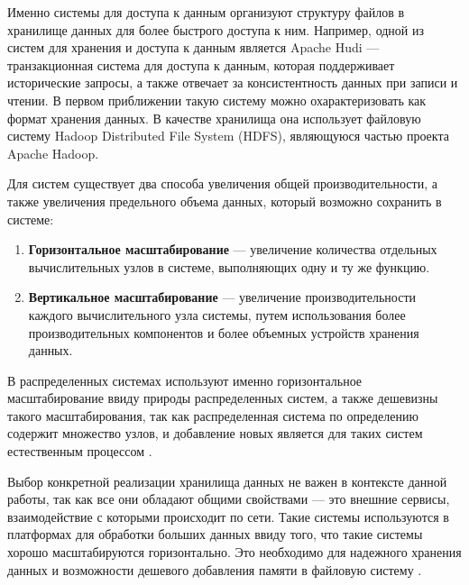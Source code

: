 Именно системы для доступа к данным организуют структуру файлов в хранилище данных для более быстрого доступа к ним. Например, одной из систем для хранения и доступа к данным является Apache Hudi --- транзакционная система для доступа к данным, которая поддерживает исторические запросы, а также отвечает за консистентность данных при записи и чтении. В первом приближении такую систему можно охарактеризовать как формат хранения данных. В качестве хранилища она использует файловую систему Hadoop Distributed File System (HDFS), являющуюся частью проекта Apache Hadoop. 

Для систем существует два способа увеличения общей производительности, а также увеличения предельного объема данных, который возможно сохранить в системе: \cite{Advanced_computer_architecture_and_parallel_processing}
\begin{enumerate}
    \item \textbf{Горизонтальное масштабирование} ---  увеличение количества отдельных вычислительных узлов в системе, выполняющих одну и ту же функцию.
    \item \textbf{Вертикальное масштабирование} --- увеличение производительности каждого вычислительного узла системы, путем использования более производительных компонентов и более объемных устройств хранения данных.
\end{enumerate}

В распределенных системах используют именно горизонтальное масштабирование ввиду природы распределенных систем, а также дешевизны такого масштабирования, так как распределенная система по определению содержит множество узлов, и добавление новых является для таких систем естественным процессом \cite{Advanced_computer_architecture_and_parallel_processing}.

Выбор конкретной реализации хранилища данных не важен в контексте данной работы, так как все они обладают общими свойствами --- это внешние  сервисы, взаимодействие с которыми происходит по сети. Такие системы используются в платформах для обработки больших данных ввиду того, что такие системы хорошо масштабируются горизонтально. Это необходимо для надежного хранения данных и возможности дешевого добавления памяти в файловую систему \cite{Distributed_File_Systems_Architectures}.

